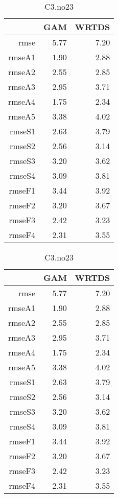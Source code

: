 \documentclass[12pt]{amsart}
\begin{document}
\begin{table}[H]
\centering
\begin{tabular}{rrr}
  \hline
 & GAM & WRTDS \\ 
  \hline
rmse & 5.77 & 7.20 \\ 
  rmseA1 & 1.90 & 2.88 \\ 
  rmseA2 & 2.55 & 2.85 \\ 
  rmseA3 & 2.95 & 3.71 \\ 
  rmseA4 & 1.75 & 2.34 \\ 
  rmseA5 & 3.38 & 4.02 \\ 
  rmseS1 & 2.63 & 3.79 \\ 
  rmseS2 & 2.56 & 3.14 \\ 
  rmseS3 & 3.20 & 3.62 \\ 
  rmseS4 & 3.09 & 3.81 \\ 
  rmseF1 & 3.44 & 3.92 \\ 
  rmseF2 & 3.20 & 3.67 \\ 
  rmseF3 & 2.42 & 3.23 \\ 
  rmseF4 & 2.31 & 3.55 \\ 
   \hline
\end{tabular}
\caption{C3.no23}
\end{table}

\begin{table}[H]
\centering
\begin{tabular}{rrr}
  \hline
 & GAM & WRTDS \\ 
  \hline
rmse & 5.77 & 7.20 \\ 
  rmseA1 & 1.90 & 2.88 \\ 
  rmseA2 & 2.55 & 2.85 \\ 
  rmseA3 & 2.95 & 3.71 \\ 
  rmseA4 & 1.75 & 2.34 \\ 
  rmseA5 & 3.38 & 4.02 \\ 
  rmseS1 & 2.63 & 3.79 \\ 
  rmseS2 & 2.56 & 3.14 \\ 
  rmseS3 & 3.20 & 3.62 \\ 
  rmseS4 & 3.09 & 3.81 \\ 
  rmseF1 & 3.44 & 3.92 \\ 
  rmseF2 & 3.20 & 3.67 \\ 
  rmseF3 & 2.42 & 3.23 \\ 
  rmseF4 & 2.31 & 3.55 \\ 
   \hline
\end{tabular}
\caption{C3.no23}
\end{table}
\end{document}
